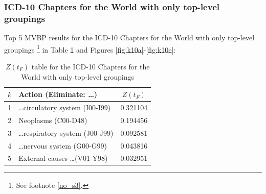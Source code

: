 \documentclass[10pt, a4paper, twocolumn]{IEEEconf}
\newcommand\footnotesstartsep{}
\begin{document}
% 
% 
% 

\subsubsection{ICD-10 Chapters for the World with only top-level groupings}

Top 5 MVBP results for the ICD-10 Chapters for the World with only top-level groupings \citep{whomortality}\footnotesstartsep\footnote{See footnote \ref{no_s3}.} in Table \ref{table:ztable10} and Figures \ref{fig:k10a}-\ref{fig:k10e}:

\begin{table}[H]
  \centering
  \begin{tabular}{clc}
    \toprule
      $k$ & Action (Eliminate: \ldots) & $Z(t_F)$ \\
    \midrule
      1 &         \ldots circulatory system (I00-I99) & 0.321104 \\
      2 &                         Neoplasms (C00-D48) & 0.194456 \\
      3 &         \ldots respiratory system (J00-J99) & 0.092581 \\
      4 &             \ldots nervous system (G00-G99) & 0.043816 \\
      5 &            External causes \ldots (V01-Y98) & 0.032951 \\
    \bottomrule
  \end{tabular}
  \caption{$Z(t_F)$ table for the ICD-10 Chapters for the World with only top-level groupings}
  \label{table:ztable10}
\end{table}
\end{document}
